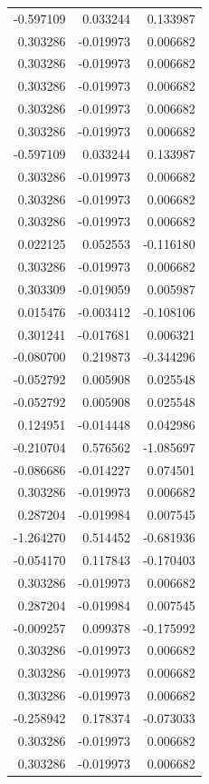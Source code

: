 \documentclass[a4paper,twoside,12pt]{book}
\begin{document}
\begin{appendices}
\begin{table}
\begin{tabular}{rrr}
	-0.597109 &  0.033244 &  0.133987 \\
	 0.303286 & -0.019973 &  0.006682 \\
	 0.303286 & -0.019973 &  0.006682 \\
	 0.303286 & -0.019973 &  0.006682 \\
	 0.303286 & -0.019973 &  0.006682 \\
	 0.303286 & -0.019973 &  0.006682 \\
	-0.597109 &  0.033244 &  0.133987 \\
	 0.303286 & -0.019973 &  0.006682 \\
	 0.303286 & -0.019973 &  0.006682 \\
	 0.303286 & -0.019973 &  0.006682 \\
	 0.022125 &  0.052553 & -0.116180 \\
	 0.303286 & -0.019973 &  0.006682 \\
	 0.303309 & -0.019059 &  0.005987 \\
	 0.015476 & -0.003412 & -0.108106 \\
	 0.301241 & -0.017681 &  0.006321 \\
	-0.080700 &  0.219873 & -0.344296 \\
	-0.052792 &  0.005908 &  0.025548 \\
	-0.052792 &  0.005908 &  0.025548 \\
	 0.124951 & -0.014448 &  0.042986 \\
	-0.210704 &  0.576562 & -1.085697 \\
	-0.086686 & -0.014227 &  0.074501 \\
	 0.303286 & -0.019973 &  0.006682 \\
	 0.287204 & -0.019984 &  0.007545 \\
	-1.264270 &  0.514452 & -0.681936 \\
	-0.054170 &  0.117843 & -0.170403 \\
	 0.303286 & -0.019973 &  0.006682 \\
	 0.287204 & -0.019984 &  0.007545 \\
	-0.009257 &  0.099378 & -0.175992 \\
	 0.303286 & -0.019973 &  0.006682 \\
	 0.303286 & -0.019973 &  0.006682 \\
	 0.303286 & -0.019973 &  0.006682 \\
	-0.258942 &  0.178374 & -0.073033 \\
	 0.303286 & -0.019973 &  0.006682 \\
	 0.303286 & -0.019973 &  0.006682 \\

\end{tabular}
\end{table}
\end{appendices}
\end{document}
